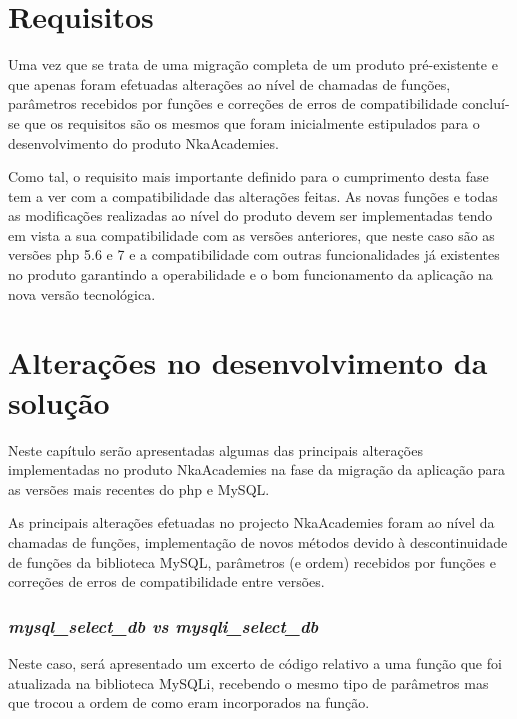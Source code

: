 
\section{Requisitos}

Uma vez que se trata de uma migração completa de um produto pré-existente e que apenas foram efetuadas alterações ao nível de chamadas de funções, parâmetros recebidos por funções e correções de erros de compatibilidade concluí-se que os requisitos são os mesmos que foram inicialmente estipulados para o desenvolvimento do produto NkaAcademies.


Como tal, o requisito mais importante definido para o cumprimento desta fase tem a ver com a compatibilidade das alterações feitas. As novas funções e todas as modificações realizadas ao nível do produto devem ser implementadas tendo em vista a sua compatibilidade com as versões anteriores, que neste caso são as versões \acrshort{php} 5.6 e 7 e a compatibilidade com outras funcionalidades já existentes no produto garantindo a operabilidade e o bom funcionamento da aplicação na nova versão tecnológica.



\section{Alterações no desenvolvimento da solução}

Neste capítulo serão apresentadas algumas das principais alterações implementadas no produto NkaAcademies na fase da migração da aplicação para as versões mais recentes do \acrshort{php} e MySQL.


As principais alterações efetuadas no projecto NkaAcademies foram ao nível da chamadas de funções, implementação de novos métodos devido à descontinuidade de funções da biblioteca MySQL, parâmetros (e ordem) recebidos por funções e correções de erros de compatibilidade entre versões.

\subsubsection{\textit{mysql\_select\_db vs mysqli\_select\_db}}

Neste caso, será apresentado um excerto de código relativo a uma função que foi atualizada na biblioteca MySQLi, recebendo o mesmo tipo de parâmetros mas que trocou a ordem de como eram incorporados na função.

